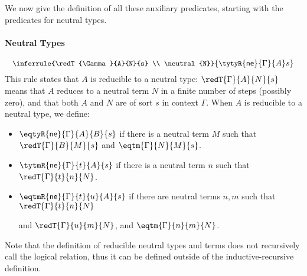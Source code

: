 
We now give the definition of all these auxiliary predicates, starting
with the predicates for neutral types.

\paragraph{Neutral Types}

\[
{\small
  \inferrule{\redT{\Gamma}{A}{N}{s} \\ \neutral{N}}
  {\tytyR{\mathsf{ne}}{\Gamma}{A}s{}}
  }
\]
This rule states that $A$ is reducible to a neutral type:
\( \redT{\Gamma}{A}{N}{s} \) means that \( A \) reduces to a neutral term \( N \)
in a finite number of steps (possibly zero), and that both \( A \) and \( N \) are of sort \( s \) in context \( \Gamma \).
%
When $A$ is reducible to a neutral type, we define:
\begin{itemize}
  \item \( \eqtyR{\mathsf{ne}}{\Gamma}{A}{B}{s} \) if there is a neutral term \( M \) such that
    \( \redT{\Gamma}{B}{M}{s} \) and \( \eqtm{\Gamma}{N}{M}{s} \).
  \item \( \tytmR{\mathsf{ne}}{\Gamma}{t}{A}{s} \) if there is a neutral term \( n \) such that
    \( \redT{\Gamma}{t}{n}{N} \).
  \item \( \eqtmR{\mathsf{ne}}{\Gamma}{t}{u}{A}{s} \) if there are neutral terms \( n, m \) such that
    \( \redT{\Gamma}{t}{n}{N} \)

    and \( \redT{\Gamma}{u}{m}{N} \), and
    \( \eqtm{\Gamma}{n}{m}{N} \).
\end{itemize}

Note that the definition of reducible neutral types and terms does not
recursively call the logical relation, thus it can be defined outside of
the inductive-recursive definition.

